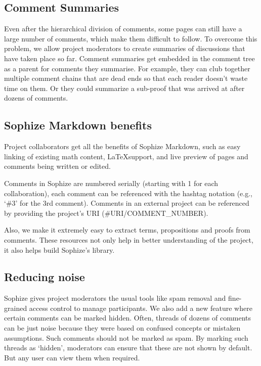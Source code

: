 \documentclass[]{ceurart}
\begin{document}
\subsection{Comment Summaries}

Even after the hierarchical division of comments, some pages can still have a large number of comments, which make them difficult to follow. To overcome this problem, we allow project moderators to create summaries of discussions that have taken place so far. Comment summaries get embedded in the comment tree as a parent for comments they summarise. For example, they can club together multiple comment chains that are dead ends so that each reader doesn't waste time on them. Or they could summarize a sub-proof that was arrived at after dozens of comments.

\subsection{Sophize Markdown benefits}

Project collaborators get all the benefits of Sophize Markdown, such as easy linking of existing math content, \LaTeX\space support, and live preview of pages and comments being written or edited.

Comments in Sophize are numbered serially (starting with 1 for each collaboration), each comment can be referenced with the hashtag notation (e.g., `\#3' for the 3rd comment). Comments in an external project can be referenced by providing the project's URI (\#URI/COMMENT\_NUMBER).

Also, we make it extremely easy to extract terms, propositions and proofs from comments. These resources not only help in better understanding of the project, it also helps build Sophize's library.

\subsection{Reducing noise}

Sophize gives project moderators the usual tools like spam removal and fine-grained access control to manage participants. We also add a new feature where certain comments can be marked hidden. Often, threads of dozens of comments can be just noise because they were based on confused concepts or mistaken assumptions. Such comments should not be marked as spam. By marking such threads as `hidden', moderators can ensure that these are not shown by default. But any user can view them when required.
\end{document}
